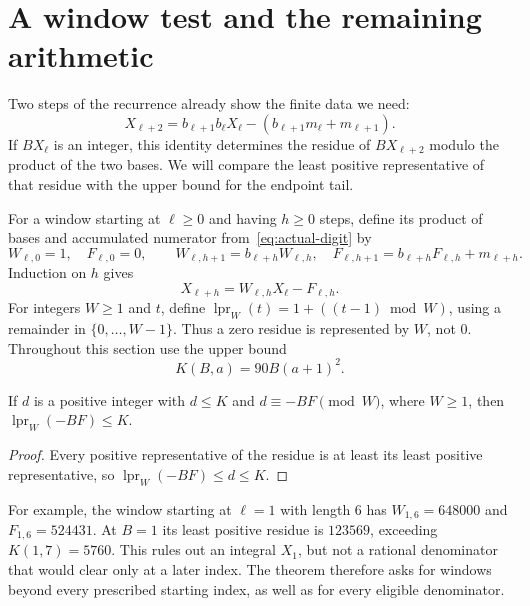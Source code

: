 \documentclass[11pt]{article}
\begin{document}
\section{A window test and the remaining arithmetic}
\label{sec:escape}\label{sec:open}
Two steps of the recurrence already show the finite data we need:
\[
 X_{\ell+2}=b_{\ell+1}b_\ell X_\ell
             -(b_{\ell+1}m_\ell+m_{\ell+1}).
\]
If $BX_\ell$ is an integer, this identity determines the residue of
$BX_{\ell+2}$ modulo the product of the two bases.  We will compare the
least positive representative of that residue with the upper bound for
the endpoint tail.

For a window starting at $\ell\ge0$ and having $h\ge0$ steps, define its
product of bases and accumulated numerator from~\eqref{eq:actual-digit} by
\[
 W_{\ell,0}=1,\quad F_{\ell,0}=0,\qquad
 W_{\ell,h+1}=b_{\ell+h}W_{\ell,h},\quad
 F_{\ell,h+1}=b_{\ell+h}F_{\ell,h}+m_{\ell+h}.
\]
Induction on $h$ gives
\begin{equation}\label{eq:actual-tail}
 X_{\ell+h}=W_{\ell,h}X_\ell-F_{\ell,h}.
\end{equation}
For integers $W\ge1$ and $t$, define
$\operatorname{lpr}_W(t)=1+((t-1)\bmod W)$, using a remainder in
$\{0,\ldots,W-1\}$.  Thus a zero residue is represented by $W$, not $0$.
Throughout this section use the upper bound
\begin{equation}\label{eq:actual-bound}
 K(B,a)=90B(a+1)^2.
\end{equation}

\begin{lemma}\label{res:consumer}
If $d$ is a positive integer with $d\le K$ and $d\equiv -BF\pmod W$,
where $W\ge1$, then $\operatorname{lpr}_W(-BF)\le K$.
\end{lemma}
\begin{proof}
Every positive representative of the residue is at least its least
positive representative, so $\operatorname{lpr}_W(-BF)\le d\le K$.
\end{proof}

For example, the window starting at $\ell=1$ with length $6$ has
$W_{1,6}=648000$ and $F_{1,6}=524431$.  At $B=1$ its least positive
residue is $123569$, exceeding $K(1,7)=5760$.  This rules out an integral
$X_1$, but not a rational denominator that would clear only at a later
index.  The theorem therefore asks for windows beyond every prescribed
starting index, as well as for every eligible denominator.
\end{document}

